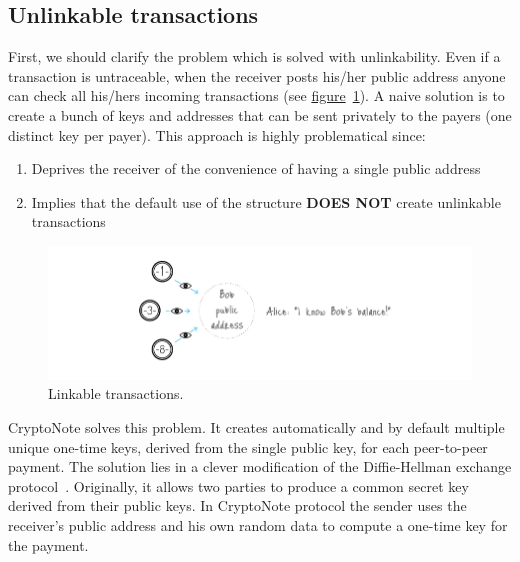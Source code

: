 \subsection{Unlinkable transactions}
First, we should clarify the problem which is solved with unlinkability. Even if a transaction is untraceable, when the receiver posts his/her public address anyone can check all his/hers incoming transactions (see \hyperref[fig:linkable]{figure}~\ref{fig:linkable}). A naive solution is to create a bunch of keys and addresses that can be sent privately to the payers (one distinct key per payer). This approach is highly problematical since:
\begin{enumerate}[label=\alph*)]
  \item Deprives the receiver of the convenience of having a single public address
  \item Implies that the default use of the structure \textbf{DOES NOT} create unlinkable transactions
\end{enumerate}
\begin{figure}[H]
  \centering
  \includegraphics[width=0.9 \columnwidth,keepaspectratio]{Images/CryptoNote/linkable.png}
  \caption{Linkable transactions.~\cite{cryptonote}}
  \label{fig:linkable}
\end{figure}
\vspace{0.2cm}

CryptoNote solves this problem. It creates automatically and by default multiple unique one-time keys, derived from the single public key, for each peer-to-peer payment. The solution lies in a clever modification of the Diffie-Hellman exchange protocol~\cite{Diffie:2006:NDC:2263321.2269104}. Originally, it allows two parties to produce a common secret key derived from their public keys. In CryptoNote protocol the sender uses the receiver's public address and his own random data to compute a one-time key for the payment.

